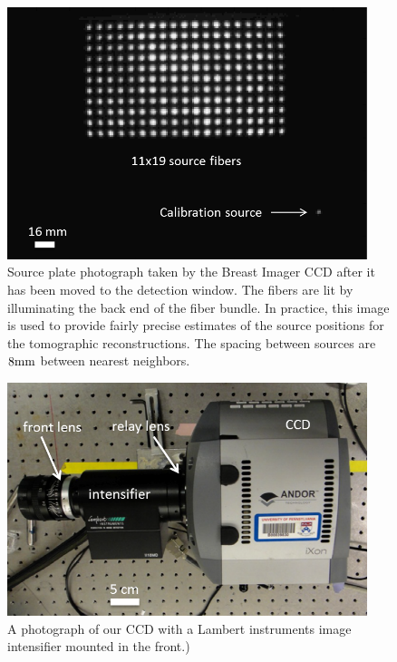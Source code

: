 \begin{figure}[h]
\begin{center}
\includegraphics[width=10.5cm]{./figures/4_Gen3/srcplatepic2.png}
\caption[Source plate photograph taken by the Breast Imager CCD after it has been moved to the detection window]{Source plate photograph taken by the Breast Imager CCD after it has been moved to the detection window. The fibers are lit by illuminating the back end of the fiber bundle. In practice, this image is used to provide fairly precise estimates of the source positions for the tomographic reconstructions. The spacing between sources are $8 {\rm mm}$ between nearest neighbors.}
\label{fig:srcplatepic}
\end{center}
\end{figure}
\begin{figure}[h]
\begin{center}
\includegraphics[width=10.5cm]{./figures/4_Gen3/camerapic.png}
\caption{A photograph of our CCD with a Lambert instruments image intensifier mounted in the front.)}
\label{fig:camerapic}
\end{center}
\end{figure}
%
